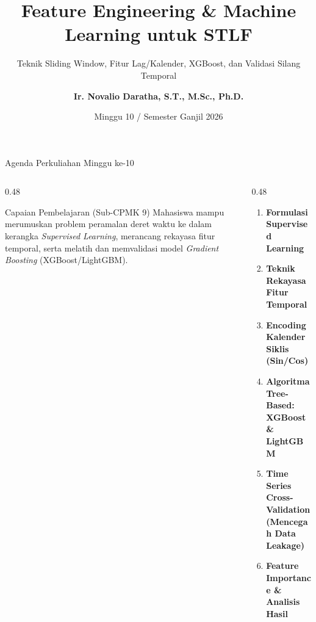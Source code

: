 \documentclass[aspectratio=169, 10pt]{beamer}
\title[\textbf{Deret Waktu (Minggu 10)}]{\textbf{Feature Engineering \& Machine Learning untuk STLF}}
\subtitle{Teknik Sliding Window, Fitur Lag/Kalender, XGBoost, dan Validasi Silang Temporal}
\author[\textbf{Ir. Novalio Daratha, Ph.D.}]{\textbf{Ir. Novalio Daratha, S.T., M.Sc., Ph.D.}}
\institute[FT UNIB]{Program Studi Teknik Elektro -- Fakultas Teknik\\Universitas Bengkulu}
\date{Minggu 10 / Semester Ganjil 2026}
\begin{document}
\begin{frame}[plain]
    \titlepage
\end{frame}

\begin{frame}{Agenda Perkuliahan Minggu ke-10}
    \begin{columns}[T]
        \begin{column}{0.48\textwidth}
            \begin{block}{Capaian Pembelajaran (Sub-CPMK 9)}
                Mahasiswa mampu merumuskan problem peramalan deret waktu ke dalam kerangka \textit{Supervised Learning}, merancang rekayasa fitur temporal, serta melatih dan memvalidasi model \textit{Gradient Boosting} (XGBoost/LightGBM).
            \end{block}
        \end{column}
        \begin{column}{0.48\textwidth}
            \begin{enumerate}
                \item \textbf{Formulasi Supervised Learning}
                \item \textbf{Teknik Rekayasa Fitur Temporal}
                \item \textbf{Encoding Kalender Siklis (Sin/Cos)}
                \item \textbf{Algoritma Tree-Based: XGBoost \& LightGBM}
                \item \textbf{Time Series Cross-Validation (Mencegah Data Leakage)}
                \item \textbf{Feature Importance \& Analisis Hasil}
            \end{enumerate}
        \end{column}
    \end{columns}
\end{frame}
\end{document}
